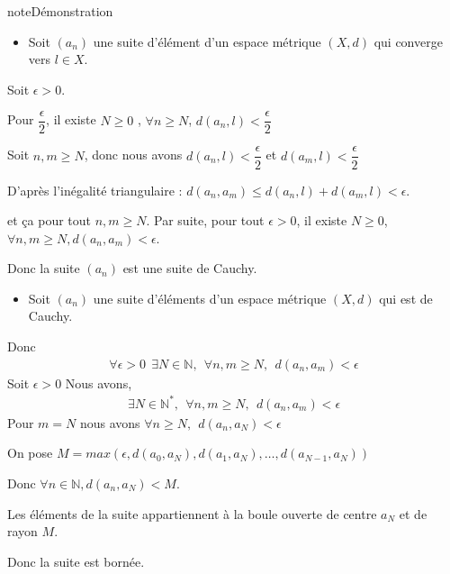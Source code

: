 \documentclass[letterpaper,10pt,french]{sphinxmanual}
\begin{document}
\begin{sphinxadmonition}{note}{Démonstration}
\begin{itemize}
\item {} 
\sphinxAtStartPar
Soit \((a_n)\) une suite d’élément d’un espace métrique \((X,d)\) qui converge vers \(l \in X\).

\end{itemize}

\sphinxAtStartPar
Soit \(\epsilon>0\).

\sphinxAtStartPar
Pour \(\dfrac{\epsilon}{2}\), il existe \(N\geq 0 \) , \(\forall n \geq N\), \(d(a_n, l)<\dfrac{\epsilon}{2}\)

\sphinxAtStartPar
Soit \(n, m \geq N\), donc nous avons \(d(a_n, l)<\dfrac{\epsilon}{2}\) et \(d(a_m, l)<\dfrac{\epsilon}{2}\)

\sphinxAtStartPar
D’après l’inégalité triangulaire :  \(d(a_n, a_m) \leq  d(a_n, l) +  d(a_m, l) < \epsilon\).

\sphinxAtStartPar
et ça pour tout \(n, m \geq N\).
Par suite, pour tout \(\epsilon > 0\), il existe \(N \geq 0\), \(\forall n, m \geq N, d(a_n, a_m) < \epsilon\).

\sphinxAtStartPar
Donc la suite \((a_n)\) est une suite de Cauchy.
\begin{itemize}
\item {} 
\sphinxAtStartPar
Soit \((a_n)\) une suite d’éléments d’un espace métrique \((X,d)\) qui est de Cauchy.

\end{itemize}

\sphinxAtStartPar
Donc
\begin{equation*}
\begin{split}
\forall \epsilon > 0 ~~ \exists N \in \mathbb N, ~~ \forall n, m \geq N, ~~ d(a_n, a_m) < \epsilon
\end{split}
\end{equation*}
\sphinxAtStartPar
Soit \(\epsilon>0\)
Nous avons,
\begin{equation*}
\begin{split}
\exists N \in \mathbb N^{*}, ~~ \forall n, m \geq N, ~~ d(a_n, a_m) < \epsilon
\end{split}
\end{equation*}
\sphinxAtStartPar
Pour \(m=N\) nous avons \(\forall n\geq N, ~~ d(a_n, a_{N}) < \epsilon\)

\sphinxAtStartPar
On pose \(M = max(\epsilon, d(a_0, a_{N}), d(a_1, a_{N}), \dots, d(a_{N-1}, a_{N}))\)

\sphinxAtStartPar
Donc \(\forall n \in \mathbb N, d(a_n, a_N)<M\).

\sphinxAtStartPar
Les éléments de la suite appartiennent à la boule ouverte de centre \(a_N\) et de rayon \(M\).

\sphinxAtStartPar
Donc la suite est bornée.
\end{sphinxadmonition}
\end{document}
